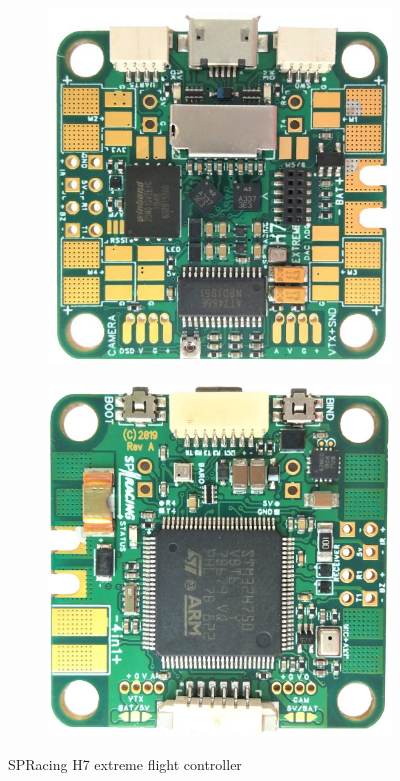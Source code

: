 \begin{figure}[htb!]
  \centering
  \begin{subfigure}[t]{0.25\textwidth}
  \includegraphics[width=1.0\textwidth]{./img/png/hw-SPracing-H7-extreme.png} 
  \end{subfigure}
%
  \begin{subfigure}[t]{0.25\textwidth}
  \includegraphics[width=1.0\textwidth]{./img/png/hw-SPracing-H7-extreme2.png} 
\end{subfigure}
%
  \caption{SPRacing H7 extreme flight controller~\cite{arduPilot-SPRacing}}%
  \label{fig:hw-SPRacing}
\end{figure}
%

